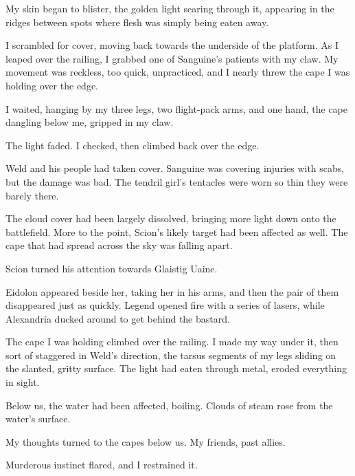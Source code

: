 My skin began to blister, the golden light searing through it, appearing in the ridges between spots where flesh was simply being eaten away.



I scrambled for cover, moving back towards the underside of the platform.  As I leaped over the railing, I grabbed one of Sanguine's patients with my claw.  My movement was reckless, too quick, unpracticed, and I nearly threw the cape I was holding over the edge.



I waited, hanging by my three legs, two flight-pack arms, and one hand, the cape dangling below me, gripped in my claw.



The light faded.  I checked, then climbed back over the edge.



Weld and his people had taken cover.  Sanguine was covering injuries with scabs, but the damage was bad.  The tendril girl's tentacles were worn so thin they were barely there.



The cloud cover had been largely dissolved, bringing more light down onto the battlefield.  More to the point, Scion's likely target had been affected as well.  The cape that had spread across the sky was falling apart.



Scion turned his attention towards Glaistig Uaine.



Eidolon appeared beside her, taking her in his arms, and then the pair of them disappeared just as quickly.  Legend opened fire with a series of lasers, while Alexandria ducked around to get behind the bastard.



The cape I was holding climbed over the railing.  I made my way under it, then sort of staggered in Weld's direction, the tarsus segments of my legs sliding on the slanted, gritty surface.  The light had eaten through metal, eroded everything in sight.



Below us, the water had been affected, boiling.  Clouds of steam rose from the water's surface.



My thoughts turned to the capes below us.  My friends, past allies.



Murderous instinct flared, and I restrained it.



